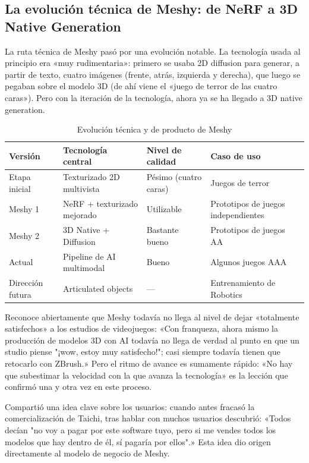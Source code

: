 \subsection{La evolución técnica de Meshy: de NeRF a 3D Native Generation}

La ruta técnica de Meshy pasó por una evolución notable. La tecnología usada al principio era «muy rudimentaria»: primero se usaba 2D diffusion para generar, a partir de texto, cuatro imágenes (frente, atrás, izquierda y derecha), que luego se pegaban sobre el modelo 3D (de ahí viene el «juego de terror de las cuatro caras»). Pero con la iteración de la tecnología, ahora ya se ha llegado a 3D native generation.

\begin{table}[H]
\centering
\caption{Evolución técnica y de producto de Meshy}
\begin{tabular}{llll}
\toprule
\textbf{Versión} & \textbf{Tecnología central} & \textbf{Nivel de calidad} & \textbf{Caso de uso} \\
\midrule
Etapa inicial & Texturizado 2D multivista & Pésimo (cuatro caras) & Juegos de terror \\
Meshy 1 & NeRF + texturizado mejorado & Utilizable & Prototipos de juegos independientes \\
Meshy 2 & 3D Native + Diffusion & Bastante bueno & Prototipos de juegos AA \\
Actual & Pipeline de AI multimodal & Bueno & Algunos juegos AAA \\
Dirección futura & Articulated objects & --- & Entrenamiento de Robotics \\
\bottomrule
\end{tabular}
\end{table}

Reconoce abiertamente que Meshy todavía no llega al nivel de dejar «totalmente satisfechos» a los estudios de videojuegos: «Con franqueza, ahora mismo la producción de modelos 3D con AI todavía no llega de verdad al punto en que un studio piense "¡wow, estoy muy satisfecho!"; casi siempre todavía tienen que retocarlo con ZBrush.» Pero el ritmo de avance es sumamente rápido: «No hay que subestimar la velocidad con la que avanza la tecnología» es la lección que confirmó una y otra vez en este proceso.

Compartió una idea clave sobre los usuarios: cuando antes fracasó la comercialización de Taichi, tras hablar con muchos usuarios descubrió: «Todos decían "no voy a pagar por este software tuyo, pero si me vendes todos los modelos que hay dentro de él, sí pagaría por ellos".» Esta idea dio origen directamente al modelo de negocio de Meshy.

